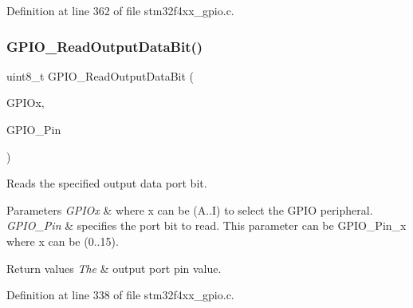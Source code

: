 Definition at line 362 of file stm32f4xx\+\_\+gpio.\+c.

\mbox{\label{group___g_p_i_o___group2_ga138270f8695b105b7c6ed405792919c1}} 
\subsubsection{\texorpdfstring{G\+P\+I\+O\+\_\+\+Read\+Output\+Data\+Bit()}{GPIO\_ReadOutputDataBit()}}
{\footnotesize\ttfamily uint8\+\_\+t G\+P\+I\+O\+\_\+\+Read\+Output\+Data\+Bit (\begin{DoxyParamCaption}\item[{\hyperlink{struct_g_p_i_o___type_def}{G\+P\+I\+O\+\_\+\+Type\+Def} $\ast$}]{G\+P\+I\+Ox,  }\item[{uint16\+\_\+t}]{G\+P\+I\+O\+\_\+\+Pin }\end{DoxyParamCaption})}



Reads the specified output data port bit. 


\begin{DoxyParams}{Parameters}
{\em G\+P\+I\+Ox} & where x can be (A..I) to select the G\+P\+IO peripheral. \\
\hline
{\em G\+P\+I\+O\+\_\+\+Pin} & specifies the port bit to read. This parameter can be G\+P\+I\+O\+\_\+\+Pin\+\_\+x where x can be (0..15). \\
\hline
\end{DoxyParams}

\begin{DoxyRetVals}{Return values}
{\em The} & output port pin value. \\
\hline
\end{DoxyRetVals}


Definition at line 338 of file stm32f4xx\+\_\+gpio.\+c.

\mbox{\label{group___g_p_i_o___group2_ga6fcd35b207a66608dd2c9d7de9247dc8}} 
